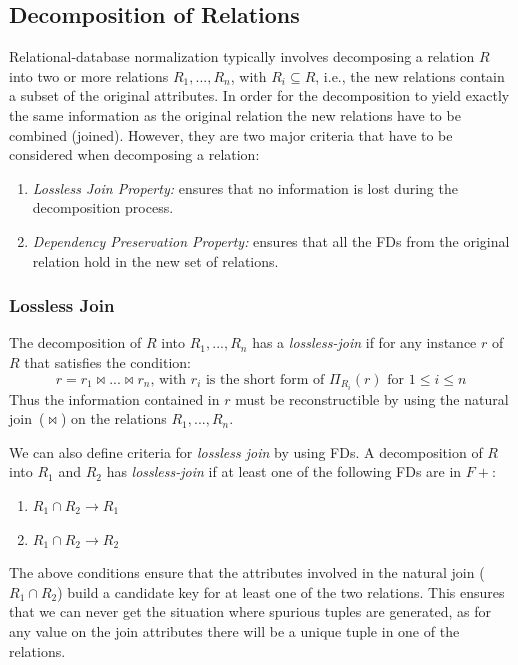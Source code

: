\subsection{Decomposition of Relations}
\label{sec:decofrel}
Relational-database normalization typically involves decomposing a relation $R$
into two or more relations $R_1,...,R_n$, with $R_i \subseteq R$, i.e., the 
new relations contain a subset of the original attributes. 
In order for the decomposition to yield
exactly the same information as the original relation the new relations have to be
combined (joined). However, they are two major criteria that have to be considered when
decomposing a relation:

\begin{enumerate}
  \item \textit{Lossless Join Property:} ensures that no information is lost during the decomposition process.
  \item \textit{Dependency Preservation Property:} ensures that all the FDs from the original relation hold in the new set of relations. 
\end{enumerate}

\subsubsection{Lossless Join}
The decomposition of $R$ into $R_1,...,R_n$ has a \textit{lossless-join} if for
any instance $r$ of $R$ that satisfies the condition: $$r = r_1 \Join ... \Join r_n \mbox{, with } r_i \mbox{ is the short form of } \Pi_{R_{i}} (r) \mbox{ for } 1 \leq i \leq n$$ 
Thus the information contained in $r$ must be reconstructible by using the natural join~($\Join$) on the relations $R_1,...,R_n$. 

We can also define criteria for \textit{lossless join} by using FDs. 
A decomposition of $R$ into $R_1$ and $R_2$ has \textit{lossless-join} 
if at least one of the following FDs are in $F+$:
\begin{enumerate}
  \item $R_1 \cap R_2 \rightarrow R_1 $ 
  \item $R_1 \cap R_2 \rightarrow R_2 $
\end{enumerate}

The above conditions ensure that the attributes involved in the natural join 
($R_1 \cap R_2$) build a candidate key for at least one of the two relations. This ensures that 
we can never get the situation where spurious tuples are generated, as for any 
value on the join attributes there will be a unique tuple in one of the relations. 

